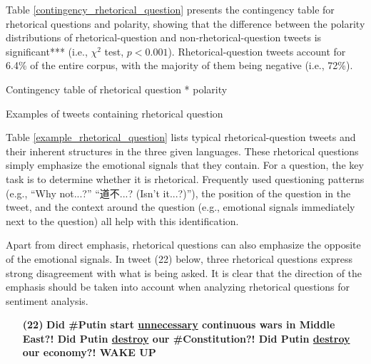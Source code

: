 \documentclass[english]{jnlp_1.4}
\begin{document}
Table \ref{contingency_rhetorical_question} presents the contingency table for rhetorical questions and polarity, showing that the difference between the polarity distributions of rhetorical-question and non-rhetorical-question tweets is significant*** (i.e., $\chi^2$ test, $p < 0.001$). Rhetorical-question tweets account for 6.4\% of the entire corpus, with the majority of them being negative (i.e., 72\%).

\begin{table}[b]
\caption{Contingency table of rhetorical question * polarity}
\label{contingency_rhetorical_question}

\end{table}
\begin{table}[b]
\caption{Examples of tweets containing rhetorical question}
\label{example_rhetorical_question}

\end{table}

Table \ref{example_rhetorical_question} lists typical rhetorical-question tweets and their inherent structures in the three given languages. These rhetorical questions simply emphasize the emotional signals that they contain. For a question, the key task is to determine whether it is rhetorical. Frequently used questioning patterns (e.g., ``Why not...?'' ``道不...? (Isn't it...?)''), the position of the question in the tweet, and the context around the question (e.g., emotional signals immediately next to the question) all help with this identification.

Apart from direct emphasis, rhetorical questions can also emphasize the opposite of the emotional signals. In tweet (22) below, three rhetorical questions express strong disagreement with what is being asked. It is clear that the direction of the emphasis should be taken into account when analyzing rhetorical questions for sentiment analysis.
\begin{enumerate}
\item[{\bf (22)}] {\bf Did \#Putin start \underline{unnecessary} continuous wars in Middle East?! Did Putin \underline{destroy} our \#Constitution?! Did Putin \underline{destroy} our economy?! WAKE UP}
\end{enumerate}
\end{document}

